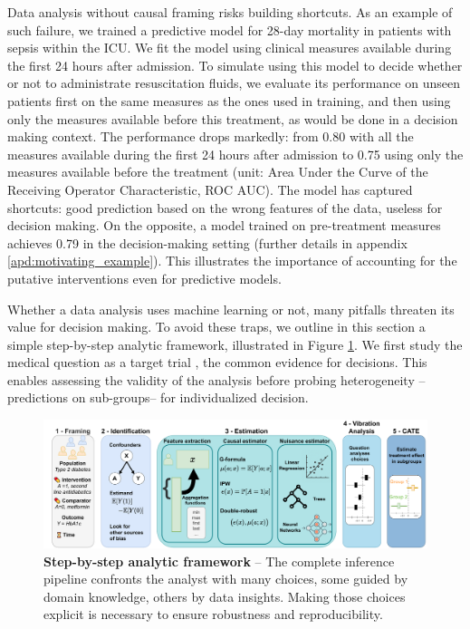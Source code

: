 \documentclass[french,12pt,twoside,a4paper]{book}
\newlength{\drop}%
\begin{document}
Data analysis without causal framing risks building shortcuts. As an example of
such failure, we trained a predictive model for 28-day mortality in patients
with sepsis within the ICU. We fit the model using clinical measures available
during the first 24 hours after admission. To simulate using this model to decide
whether or not to administrate resuscitation fluids, we evaluate its performance
on unseen patients first on the same measures as the ones used in training, and then using only the measures available before this treatment, as would be done in a decision making context. The
performance drops markedly: from 0.80 with all the measures available during the first 24 hours after admission to 0.75 using only the measures available before the treatment (unit: Area Under the Curve of the Receiving Operator Characteristic, ROC AUC).
The model has captured shortcuts: good prediction based on the wrong features of the
data, useless for decision making.
On the opposite, a model trained on pre-treatment measures achieves 0.79 in
the decision-making setting (further details
in appendix \ref{apd:motivating_example}). This illustrates the importance of
accounting for the putative interventions even for predictive models.

Whether a data analysis uses machine learning or not, many pitfalls
threaten its value for decision making. To avoid these traps,
we outline in this section a simple step-by-step analytic framework,
illustrated in Figure \ref{fig:inference_framework}. We first study the medical
question as a target trial \citep{hernan2021methods}, the common
evidence for decisions. This enables assessing the validity of the
analysis before probing heterogeneity --predictions on sub-groups-- for
individualized decision.

\begin{figure}[!t]
  \centering
  \includegraphics[width=1.0\linewidth]{img/chapter_4/complete_inference_flow.pdf}
  \caption{\textbf{Step-by-step analytic framework} -- The complete
    inference pipeline confronts the analyst with
    many choices, some guided by domain knowledge, others
    by data insights. Making those choices explicit is necessary to ensure
    robustness and reproducibility.}\label{fig:inference_framework}
\end{figure}
\end{document}
